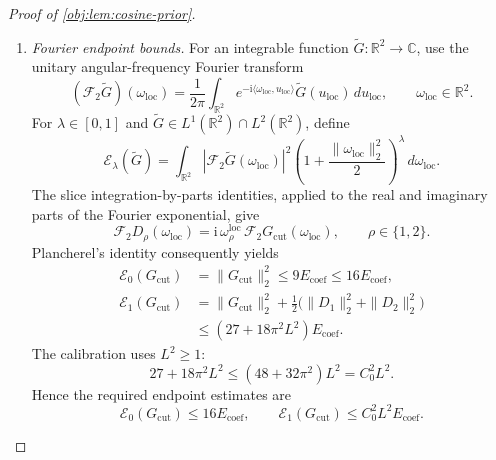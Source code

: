 \begin{proof}[Proof of \cref{obj:lem:cosine-prior}]
\begin{enumerate}
\[\begin{aligned}
 \leq9\pi^2L^2E_{\mathrm{coef}},\\
\int_{[-1,2]^2}|\partial_2U_{\mathrm{loc}}|^2
&=9\pi^2\sum_{a,b=1}^L b^2(c^{\mathrm{loc}}_{ab})^2
 \leq9\pi^2L^2E_{\mathrm{coef}},\\
\int_{[-1,2]^2}\|\nabla U_{\mathrm{loc}}\|_2^2
&\leq18\pi^2L^2E_{\mathrm{coef}}.
\end{aligned}
\]
Since \(0\leq\chi_{\mathrm{cut}}\leq1\),
\[
\|G_{\mathrm{cut}}\|_{L^2(\mathbb R^2)}^2
\leq9E_{\mathrm{coef}}.
\]
For each coordinate, apply
\((r_1+r_2)^2\leq2r_1^2+2r_2^2\), valid for real \(r_1,r_2\), to the
two terms defining \(D_\rho\). Summing the two coordinate inequalities
and using the cutoff derivative bound gives
\[
\frac12(D_1^2+D_2^2)
\leq
\chi_{\mathrm{cut}}^2
 \bigl(|\partial_1U_{\mathrm{loc}}|^2+
       |\partial_2U_{\mathrm{loc}}|^2\bigr)
+2|U_{\mathrm{loc}}|^2.
\]
Thus
\[
D_1^2+D_2^2
\leq2\|\nabla U_{\mathrm{loc}}\|_2^2+4|U_{\mathrm{loc}}|^2
\]
on the support square. Integration proves
\[
\|D_1\|_{L^2(\mathbb R^2)}^2+
\|D_2\|_{L^2(\mathbb R^2)}^2
\leq(36+36\pi^2L^2)E_{\mathrm{coef}}.
\]

\item \emph{Fourier endpoint bounds.}
For an integrable function
\(\widetilde G:\mathbb R^2\to\mathbb C\), use the unitary angular-frequency
Fourier transform
\[
(\mathcal F_2\widetilde G)(\omega_{\mathrm{loc}})
=\frac{1}{2\pi}\int_{\mathbb R^2}
 e^{-\mathrm i\langle\omega_{\mathrm{loc}},u_{\mathrm{loc}}\rangle}
 \widetilde G(u_{\mathrm{loc}})\,du_{\mathrm{loc}},
\qquad \omega_{\mathrm{loc}}\in\mathbb R^2.
\]
For \(\lambda\in[0,1]\) and
\(\widetilde G\in L^1(\mathbb R^2)\cap L^2(\mathbb R^2)\), define
\[
\mathcal E_\lambda(\widetilde G)
=\int_{\mathbb R^2}
 |\mathcal F_2\widetilde G(\omega_{\mathrm{loc}})|^2
 \left(1+\frac{\|\omega_{\mathrm{loc}}\|_2^2}{2}\right)^\lambda
 \,d\omega_{\mathrm{loc}}.
\]
The slice integration-by-parts identities, applied to the real and
imaginary parts of the Fourier exponential, give
\[
\mathcal F_2D_\rho(\omega_{\mathrm{loc}})
=\mathrm i\,\omega_\rho^{\mathrm{loc}}\,
 \mathcal F_2G_{\mathrm{cut}}(\omega_{\mathrm{loc}}),
\qquad \rho\in\{1,2\}.
\]
Plancherel's identity consequently yields
\[
\begin{aligned}
\mathcal E_0(G_{\mathrm{cut}})
&=\|G_{\mathrm{cut}}\|_2^2
 \leq9E_{\mathrm{coef}}
 \leq16E_{\mathrm{coef}},\\
\mathcal E_1(G_{\mathrm{cut}})
&=\|G_{\mathrm{cut}}\|_2^2
 +\frac12\bigl(\|D_1\|_2^2+\|D_2\|_2^2\bigr)\\
&\leq(27+18\pi^2L^2)E_{\mathrm{coef}}.
\end{aligned}
\]
The calibration uses \(L^2\geq1\):
\[
27+18\pi^2L^2
\leq(48+32\pi^2)L^2=C_0^2L^2.
\]
Hence the required endpoint estimates are
\[
\mathcal E_0(G_{\mathrm{cut}})\leq16E_{\mathrm{coef}},
\qquad
\mathcal E_1(G_{\mathrm{cut}})\leq C_0^2L^2E_{\mathrm{coef}}.
\]


\end{enumerate}
\end{proof}
